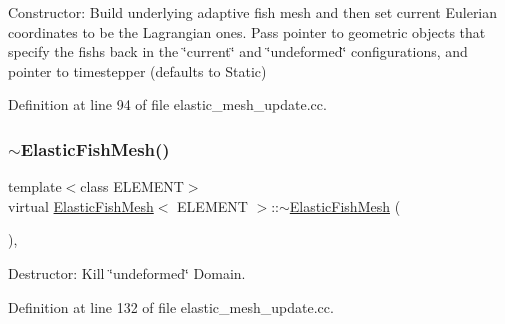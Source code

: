 Constructor\+: Build underlying adaptive fish mesh and then set current Eulerian coordinates to be the Lagrangian ones. Pass pointer to geometric objects that specify the fish\textquotesingle{}s back in the \char`\"{}current\char`\"{} and \char`\"{}undeformed\char`\"{} configurations, and pointer to timestepper (defaults to Static) 



Definition at line 94 of file elastic\+\_\+mesh\+\_\+update.\+cc.

\mbox{\label{classElasticFishMesh_ab8e084bb7551b9765b95dc38e82ab1be}} 
\subsubsection{\texorpdfstring{$\sim$\+Elastic\+Fish\+Mesh()}{~ElasticFishMesh()}\hspace{0.1cm}{\footnotesize\ttfamily [1/2]}}
{\footnotesize\ttfamily template$<$class E\+L\+E\+M\+E\+NT$>$ \\
virtual \hyperlink{classElasticFishMesh}{Elastic\+Fish\+Mesh}$<$ E\+L\+E\+M\+E\+NT $>$\+::$\sim$\hyperlink{classElasticFishMesh}{Elastic\+Fish\+Mesh} (\begin{DoxyParamCaption}{ }\end{DoxyParamCaption})\hspace{0.3cm}{\ttfamily [inline]}, {\ttfamily [virtual]}}



Destructor\+: Kill \char`\"{}undeformed\char`\"{} Domain. 



Definition at line 132 of file elastic\+\_\+mesh\+\_\+update.\+cc.

\mbox{\label{classElasticFishMesh_a76c4d63d48b9ee48c3742e55057cfba0}} 
